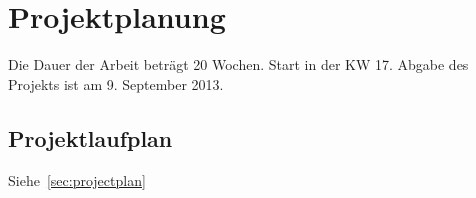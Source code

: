 \documentclass[a4paper,12pt,fleqn]{article}
\begin{document}
\section{Projektplanung}
Die Dauer der Arbeit beträgt 20 Wochen. Start in der KW 17. Abgabe des Projekts ist am 9. September 2013.
\subsection{Projektlaufplan}
Siehe~\ref{sec:projectplan}



\newpage


\end{document}
